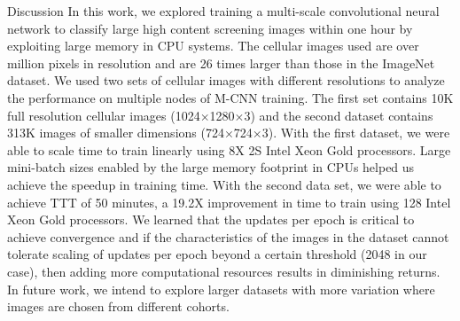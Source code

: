 \begin{section}{Discussion} \label{sec:discussion}
	\noindent  In this work, we explored training a multi-scale convolutional neural network to classify large high content screening images within one hour by exploiting large memory in CPU systems. The cellular images used are over million pixels in resolution and are 26 times larger than those in the ImageNet dataset. We used two sets of cellular images with different resolutions to analyze the performance on multiple nodes of M-CNN training. The first set contains 10K full resolution cellular images (1024$\times$1280$\times$3) and the second dataset contains 313K images of smaller dimensions (724$\times$724$\times$3). With the first dataset, we were able to scale time to train linearly using 8X 2S Intel\textregistered{} Xeon\textregistered{} Gold processors. Large mini-batch sizes enabled by the large memory footprint in CPUs helped us achieve the speedup in training time. With the second data set, we were able to achieve TTT of 50 minutes, a 19.2X improvement in time to train using 128 Intel\textregistered{} Xeon\textregistered{} Gold processors. We learned that the updates per epoch is critical to achieve convergence and if the characteristics of the images in the dataset cannot tolerate scaling of updates per epoch beyond a certain threshold (2048 in our case), then adding more computational resources results in diminishing returns. In future work, we intend to explore larger datasets with more variation where images are chosen from different cohorts.
\end{section}
